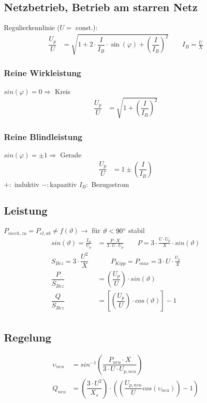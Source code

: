 \subsection{Netzbetrieb, Betrieb am starren Netz}
Regulierkennlinie ($U=$ const.):
\begin{align*}
    \dfrac{U_p}{U} &=  \sqrt{1+2\cdot \dfrac{I}{I_B} \cdot \sin(\varphi) + \left( \dfrac{I}{I_B}\right)^2} \qquad I_B = \frac{U}{X}
\end{align*}
\subsubsection{Reine Wirkleistung}
$sin(\varphi) = 0 \Rightarrow$ Kreis
\begin{align*}
    \dfrac{U_p}{U} &= \sqrt{1+ \left(\dfrac{I}{I_B}\right)^2}
\end{align*}

\subsubsection{Reine Blindleistung}
$    sin(\varphi) = \pm1 \Rightarrow$ Gerade
\begin{align*}
    \dfrac{U_p}{U} &= 1 \pm \left(\dfrac{I}{I_B}\right)
\end{align*}
$+ :$ induktiv \qquad $- :$kapazitiv \qquad $I_B :$ Bezugsstrom

\subsection{Leistung}
$P_{mech,zu} = P_{el,ab} \neq f(\vartheta) \rightarrow$ für $\vartheta < 90\degree$ stabil\\
\begin{align*}
    sin(\vartheta) = \frac{I_w}{U_p} &= \frac{P\cdot X}{3\cdot U \cdot U_p}  \qquad P = 3 \cdot \frac{U\cdot U_p}{X} \cdot sin(\vartheta)\\
    S_{Bez} = 3 \cdot \dfrac{U^2}{X} & \qquad P_{Kipp} = P_{max} = 3\cdot U \cdot \frac{U_p}{X}\\
    \dfrac{P}{S_{Bez}} &= \left(\dfrac{U_p}{U}\right) \cdot sin(\vartheta)\\
    \dfrac{Q}{S_{Bez}} &= \left[\left(\dfrac{U_p}{U}\right) \cdot cos(\vartheta)\right] -1\\
\end{align*}

\subsection{Regelung}
\begin{align*}
    \upsilon_{neu} &= sin^{-1}\left( \dfrac{P_{neu} \cdot X}{3 \cdot U \cdot U_{p,neu}}\right)\\
    Q_{neu} &= \left( \dfrac{3 \cdot U^2}{X_s}\right) \cdot \left( \left( \dfrac{U_{p,neu}}{U} cos( \upsilon_{neu})\right)-1\right)
\end{align*}

